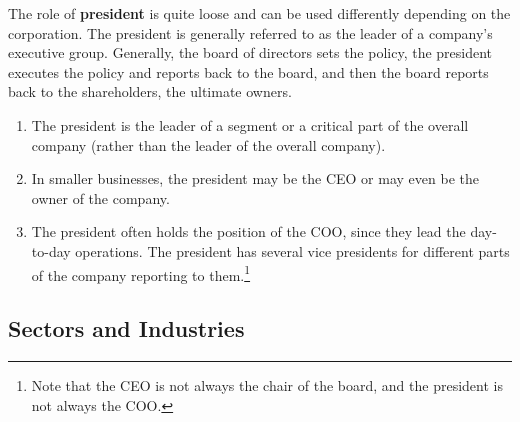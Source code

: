 \documentclass{article}
\begin{document}
    \begin{definition}[President]
      The role of \textbf{president} is quite loose and can be used differently depending on the corporation. The president is generally referred to as the leader of a company's executive group. Generally, the board of directors sets the policy, the president executes the policy and reports back to the board, and then the board reports back to the shareholders, the ultimate owners. 
      \begin{enumerate}
          \item The president is the leader of a segment or a critical part of the overall company (rather than the leader of the overall company). 
          \item In smaller businesses, the president may be the CEO or may even be the owner of the company. 
          \item The president often holds the position of the COO, since they lead the day-to-day operations. The president has several vice presidents for different parts of the company reporting to them.\footnote{Note that the CEO is not always the chair of the board, and the president is not always the COO. }
      \end{enumerate}
    \end{definition}

  \subsection{Sectors and Industries}

    \begin{definition}
      
    \end{definition}

    \begin{definition}
      
    \end{definition}

    \begin{definition}
      
    \end{definition}

    \begin{definition}[Finance]
      
    \end{definition}

    \begin{definition}[Utilities]
      
    \end{definition}
\end{document}
